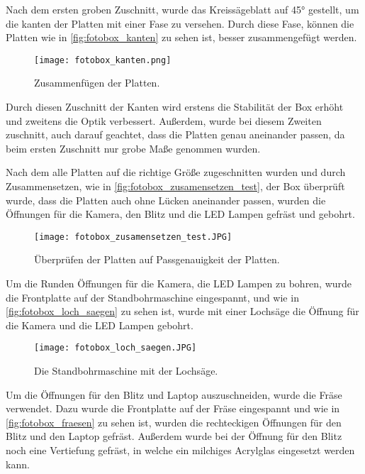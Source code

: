 Nach dem ersten groben Zuschnitt, wurde das Kreissägeblatt auf 45° gestellt, um
die kanten der Platten mit einer Fase zu versehen. Durch diese Fase, können die Platten
wie in \autoref{fig:fotobox_kanten} zu sehen ist, besser zusammengefügt werden.

\begin{figure}[H]
    \centering
    \texttt{[image: fotobox\_kanten.png]}
    \caption{Zusammenfügen der Platten.}
    \label{fig:fotobox_kanten}
\end{figure}

Durch diesen Zuschnitt der Kanten wird erstens die Stabilität der Box erhöht
und zweitens die Optik verbessert. 
Außerdem, wurde bei diesem Zweiten zuschnitt, auch darauf geachtet, dass die
Platten genau aneinander passen, da beim ersten Zuschnitt nur grobe Maße
genommen wurden.

\newpage

Nach dem alle Platten auf die richtige Größe zugeschnitten wurden und durch
Zusammensetzen, wie in \autoref{fig:fotobox_zusamensetzen_test}, der Box überprüft
wurde, dass die Platten auch ohne Lücken aneinander passen, wurden die Öffnungen
für die Kamera, den Blitz und die LED Lampen gefräst und gebohrt.

\begin{figure}[H]
    \centering
    \texttt{[image: fotobox\_zusamensetzen\_test.JPG]}
    \caption{Überprüfen der Platten auf Passgenauigkeit der Platten.}
    \label{fig:fotobox_zusamensetzen_test}
\end{figure}

Um die Runden Öffnungen für die Kamera, die LED Lampen zu bohren, wurde die Frontplatte
auf der Standbohrmaschine eingespannt, und wie in \autoref{fig:fotobox_loch_saegen} zu sehen ist,
wurde mit einer Lochsäge die Öffnung für die Kamera und die LED Lampen gebohrt.

\begin{figure}[H]
    \centering
    \texttt{[image: fotobox\_loch\_saegen.JPG]}
    \caption{Die Standbohrmaschine mit der Lochsäge.}
    \label{fig:fotobox_loch_saegen}
\end{figure}

Um die Öffnungen für den Blitz und Laptop auszuschneiden, wurde die Fräse verwendet.
Dazu wurde die Frontplatte auf der Fräse eingespannt und wie in
\autoref{fig:fotobox_fraesen} zu sehen ist, wurden die rechteckigen Öffnungen
für den Blitz und den Laptop gefräst. Außerdem wurde bei der Öffnung für den Blitz
noch eine Vertiefung gefräst, in welche ein milchiges Acrylglas eingesetzt werden kann.

